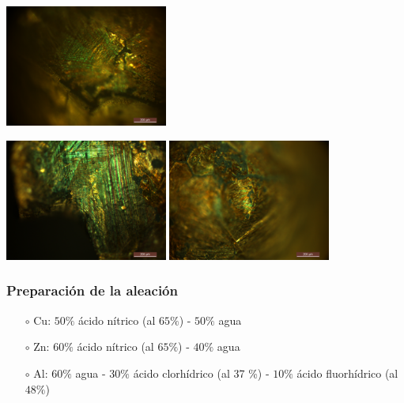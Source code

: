 \documentclass[usenames,dvipsnames]{beamer}
\begin{document}
\begin{frame}

\includegraphics[width=0.4\textwidth]{img/intro/EspAMicro4.jpg}

\includegraphics[width=0.4\textwidth]{img/intro/EspAMicro2.jpg}
\includegraphics[width=0.4\textwidth]{img/intro/EspAMicro3.jpg}
 
\end{frame}






\begin{frame}
 
 \frametitle{Preparación de la aleación}
 
 \begin{itemize}
 \item[$\circ$] Cu: $50 \%$ ácido nítrico (al $65 \%$) - $50 \%$ agua
 \item[$\circ$] Zn: $60 \%$ ácido nítrico (al $65 \%$) - $40 \%$ agua
 \item[$\circ$] Al: $60 \%$ agua - $30 \%$ ácido clorhídrico (al 37 \%) - $10 \%$ ácido fluorhídrico (al $48 \%$)
\end{itemize}
\end{frame}
\end{document}
